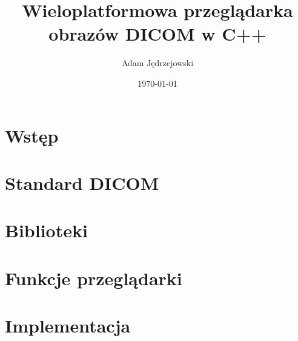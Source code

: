 \documentclass{article}
\author{Adam Jędrzejowski}
\title{Wieloplatformowa przeglądarka obrazów DICOM w C++}
\date{\today}
\begin{document}
\maketitle

\part{Wstęp}


\part{Standard DICOM}

\part{Biblioteki}

\part{Funkcje przeglądarki}

\part{Implementacja}

\end{document}
